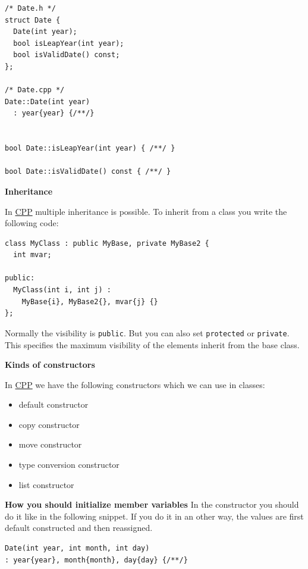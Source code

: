 \documentclass[11pt,twoside,landscape]{article}
\begin{document}
\begin{multicols}{3}
\lstset{language=c++,label= ,caption= ,captionpos=b,numbers=none}
\begin{lstlisting}
/* Date.h */
struct Date {
  Date(int year);
  bool isLeapYear(int year);
  bool isValidDate() const;
};

/* Date.cpp */
Date::Date(int year)
  : year{year} {/**/}


bool Date::isLeapYear(int year) { /**/ }

bool Date::isValidDate() const { /**/ }
\end{lstlisting}

\textbf{Inheritance}

In \href{../../../roam/20210920103243-c.org}{CPP} multiple inheritance is possible.
To inherit from a class you write the following code:

\lstset{language=c++,label= ,caption= ,captionpos=b,numbers=none}
\begin{lstlisting}
class MyClass : public MyBase, private MyBase2 {
  int mvar;

public:
  MyClass(int i, int j) :
    MyBase{i}, MyBase2{}, mvar{j} {}
};
\end{lstlisting}

Normally the visibility is \texttt{public}.
But you can also set \texttt{protected} or \texttt{private}.
This specifies the maximum visibility of the elements inherit from the base class.

\textbf{Kinds of constructors}

In \href{../../../roam/20210920103243-c.org}{CPP} we have the following constructors which we can use in classes:
\begin{itemize}
\item default constructor
\item copy constructor
\item move constructor
\item type conversion constructor
\item list constructor
\end{itemize}


\textbf{How you should initialize member variables}
In the constructor you should do it like in the following snippet.
If you do it in an other way, the values are first default constructed and then reassigned.
\lstset{language=c++,label= ,caption= ,captionpos=b,numbers=none}
\begin{lstlisting}
Date(int year, int month, int day)
: year{year}, month{month}, day{day} {/**/}
\end{lstlisting}


\end{multicols}
\end{document}
